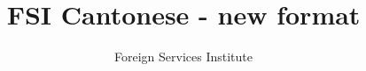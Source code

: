 \documentclass[UTF8]{ctexart}
\begin{document}
\title{FSI Cantonese - new format}
\author{Foreign Services Institute}

\maketitle

\tableofcontents






\end{document}
